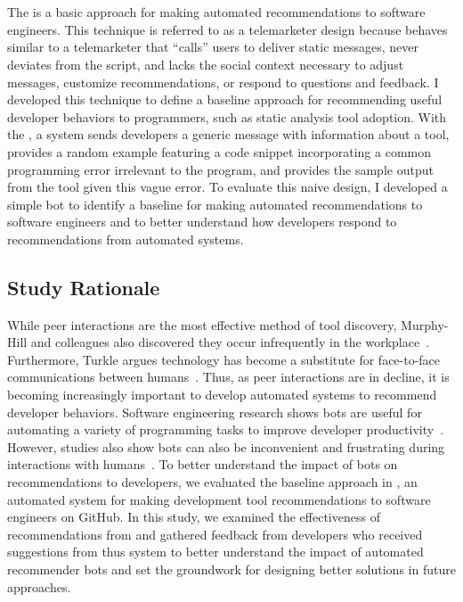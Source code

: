 \section{\TELE}

The \tele is a basic approach for making automated recommendations to software engineers. This technique is referred to as a telemarketer design because behaves similar to a telemarketer that ``calls'' users to deliver static messages, never deviates from the script, and lacks the social context necessary to adjust messages, customize recommendations, or respond to questions and feedback. I developed this technique to define a baseline approach for recommending useful developer behaviors to programmers, such as static analysis tool adoption. With the \tele, a system sends developers a generic message with information about a tool, provides a random example featuring a code snippet incorporating a common programming error irrelevant to the program, and provides the sample output from the tool given this vague error. To evaluate this naive design, I developed a simple bot to identify a baseline for making automated recommendations to software engineers and to better understand how developers respond to recommendations from automated systems.

\subsection{Study Rationale}

While peer interactions are the most effective method of tool discovery, Murphy-Hill and colleagues also discovered they occur infrequently in the workplace~\cite{Murphy-Hill2011PeerInteraction}. Furthermore, Turkle argues technology has become a substitute for face-to-face communications between humans~\cite{turkle2017alone}. Thus, as peer interactions are in decline, it is becoming increasingly important to develop automated systems to recommend developer behaviors. Software engineering research shows bots are useful for automating a variety of programming tasks to improve developer productivity~\cite{storey2016bots}. However, studies also show bots can also be inconvenient and frustrating during interactions with humans~\cite{Hill2015Chatbots, Stanfill86MemBasedReasoning}. To better understand the impact of bots on recommendations to developers, we evaluated the \tele baseline approach in \toolone, an automated system for making development tool recommendations to software engineers on GitHub. In this study, we examined the effectiveness of recommendations from \toolone and gathered feedback from developers who received suggestions from thus system to better understand the impact of automated recommender bots and set the groundwork for designing better solutions in future approaches.



